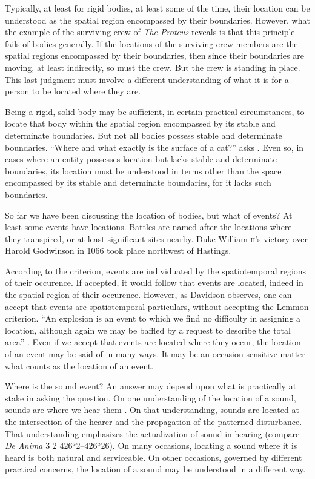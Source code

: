 Typically, at least for rigid bodies, at least some of the time, their location can be understood as the spatial region encompassed by their boundaries. However, what the example of the surviving crew of \emph{The Proteus} reveals is that this principle fails of bodies generally. If the locations of the surviving crew members are the spatial regions encompassed by their boundaries, then since their boundaries are moving, at least indirectly, so must the crew. But the crew is standing in place. This last judgment must involve a different understanding of what it is for a person to be located where they are.

Being a rigid, solid body may be sufficient, in certain practical circumstances, to locate that body within the spatial region encompassed by its stable and determinate boundaries. But not all bodies possess stable and determinate boundaries. ``Where and what exactly is the surface of a cat?'' asks \citet[lecture 9]{Austin:1962lr}. Even so, in cases where an entity possesses location but lacks stable and determinate boundaries, its location must be understood in terms other than the space encompassed by its stable and determinate boundaries, for it lacks such boundaries.

So far we have been discussing the location of bodies, but what of events? At least some events have locations. Battles are named after the locations where they transpired, or at least significant sites nearby. Duke William \textsc{ii}'s victory over Harold Godwinson in 1066 took place northwest of Hastings.

According to the \citet{Lemmon:1967aa} criterion, events are individuated by the spatiotemporal regions of their occurence. If accepted, it would follow that events are located, indeed in the spatial region of their occurence. However, as Davidson observes, one can accept that events are spatiotemporal particulars, without accepting the Lemmon criterion. ``An explosion is an event to which we find no difficulty in assigning a location, although again we may be baffled by a request to describe the total area'' \citep[304]{Davidson:1969da}. Even if we accept that events are located where they occur, the location of an event may be said of in many ways. It may be an occasion sensitive matter what counts as the location of an event. 

Where is the sound event? An answer may depend upon what is practically at stake in asking the question. On one understanding of the location of a sound, sounds are where we hear them \citep{OShaughnessy:2009aa}. On that understanding, sounds are located at the intersection of the hearer and the propagation of the patterned disturbance. That understanding emphasizes the actualization of sound in hearing (compare \emph{De Anima} 3 2 426\( ^{a} \)2--426\( ^{a} \)26). On many occasions, locating a sound where it is heard is both natural and serviceable.  On other occasions, governed by different practical concerns, the location of a sound may be understood in a different way. 

